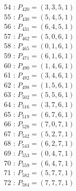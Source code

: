 \documentclass{article}
\begin{document}
{\begin{multicols}{3}
54 : $P_{420}=( 3, 3, 5, 1 )$\\
55 : $P_{430}=( 5, 4, 5, 1 )$\\
56 : $P_{431}=( 6, 4, 5, 1 )$\\
57 : $P_{462}=( 5, 0, 6, 1 )$\\
58 : $P_{465}=( 0, 1, 6, 1 )$\\
59 : $P_{471}=( 6, 1, 6, 1 )$\\
60 : $P_{490}=( 1, 4, 6, 1 )$\\
61 : $P_{492}=( 3, 4, 6, 1 )$\\
62 : $P_{498}=( 1, 5, 6, 1 )$\\
63 : $P_{502}=( 5, 5, 6, 1 )$\\
64 : $P_{516}=( 3, 7, 6, 1 )$\\
65 : $P_{519}=( 6, 7, 6, 1 )$\\
66 : $P_{528}=( 7, 0, 7, 1 )$\\
67 : $P_{542}=( 5, 2, 7, 1 )$\\
68 : $P_{543}=( 6, 2, 7, 1 )$\\
69 : $P_{553}=( 0, 4, 7, 1 )$\\
70 : $P_{559}=( 6, 4, 7, 1 )$\\
71 : $P_{582}=( 5, 7, 7, 1 )$\\
72 : $P_{584}=( 7, 7, 7, 1 )$\\
\end{multicols}


%


%


}%
\end{document}
